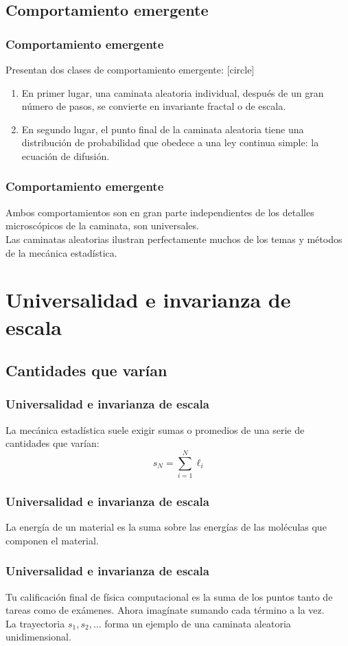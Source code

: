 \subsection*{Comportamiento emergente}
\begin{frame}
\frametitle{Comportamiento emergente}
Presentan dos clases de comportamiento emergente:
[circle]
\begin{enumerate}[<+->]
\item En primer lugar, una caminata aleatoria individual, después de un gran número de pasos, se convierte en invariante fractal o de escala.
\item En segundo lugar, el punto final de la caminata aleatoria tiene una distribución de probabilidad que obedece a una ley continua simple: la ecuación de difusión.
\end{enumerate}
\end{frame}
\begin{frame}
\frametitle{Comportamiento emergente}
Ambos comportamientos son en gran parte independientes de los detalles microscópicos de la caminata, son universales.
\\
\bigskip
Las caminatas aleatorias ilustran perfectamente muchos de los temas y métodos de la mecánica estadística.
\end{frame}
\section{Universalidad e invarianza de escala}
\subsection{Cantidades que varían}
\begin{frame}
\frametitle{Universalidad e invarianza de escala}
La mecánica estadística suele exigir sumas o promedios de una serie de cantidades que varían:\[\ s_{N} = \sum_{i = 1}^{N} \ell_{i}  \]
\end{frame}
\begin{frame}
\frametitle{Universalidad e invarianza de escala}
La energía de un material es la suma sobre las energías de las moléculas que componen el material.
\end{frame}
\begin{frame}
\frametitle{Universalidad e invarianza de escala}
Tu calificación final de física computacional es la suma de los puntos tanto de tareas como de exámenes. Ahora imagínate sumando cada término a la vez.
\\
\bigskip
La trayectoria $s_{1}, s_{2}, \ldots$ forma un ejemplo de una caminata aleatoria unidimensional.
\end{frame}
